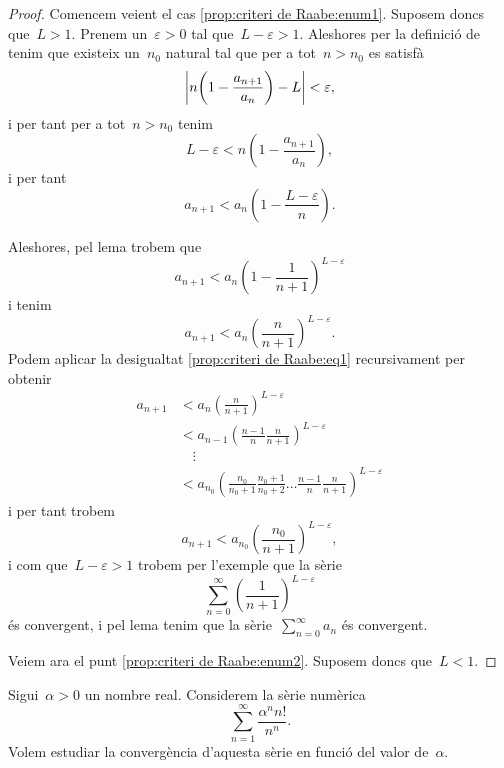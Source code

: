 \documentclass[../../main.tex]{subfiles}
\begin{document}
    \begin{proof}
        Comencem veient el cas \eqref{prop:criteri de Raabe:enum1}.
        Suposem doncs que~\(L>1\).
        Prenem un~\(\varepsilon>0\) tal que~\(L-\varepsilon>1\).
        Aleshores per la definició de  tenim que existeix un~\(n_{0}\) natural tal que per a tot~\(n>n_{0}\) es satisfà
        \[
            \abs{n\left(1-\frac{a_{n+1}}{a_{n}}\right)-L}<\varepsilon,
        \]
        i per tant per a tot~\(n>n_{0}\) tenim
        \[
            L-\varepsilon<n\left(1-\frac{a_{n+1}}{a_{n}}\right),
        \]
        i per tant
        \[
            a_{n+1}<a_{n}\left(1-\frac{L-\varepsilon}{n}\right).
        \]

        Aleshores, pel lema  trobem que
        \[
            a_{n+1}<a_{n}\left(1-\frac{1}{n+1}\right)^{L-\varepsilon}
        \]
        i tenim
        \begin{equation}
            \label{prop:criteri de Raabe:eq1}
            a_{n+1}<a_{n}\left(\frac{n}{n+1}\right)^{L-\varepsilon}.
        \end{equation}
        Podem aplicar la desigualtat \eqref{prop:criteri de Raabe:eq1} recursivament per obtenir
        \begin{align*}
            a_{n+1}&<a_{n}\left(\frac{n}{n+1}\right)^{L-\varepsilon}\\
            &<a_{n-1}\left(\frac{n-1}{n}\frac{n}{n+1}\right)^{L-\varepsilon}\\
            &\quad\vdots\\
            &<a_{n_{0}}\left(\frac{n_{0}}{n_{0}+1}\frac{n_{0}+1}{n_{0}+2}\dots\frac{n-1}{n}\frac{n}{n+1}\right)^{L-\varepsilon}
        \end{align*}
        i per tant trobem
        \[
            a_{n+1}<a_{n_{0}}\left(\frac{n_{0}}{n+1}\right)^{L-\varepsilon},
        \]
        i com que~\(L-\varepsilon>1\) trobem per l'exemple  que la sèrie
        \[
            \sum_{n=0}^{\infty}\left(\frac{1}{n+1}\right)^{L-\varepsilon}
        \]
        és convergent, i pel lema  tenim que la sèrie~\(\sum_{n=0}^{\infty}a_{n}\) és convergent.

        Veiem ara el punt \eqref{prop:criteri de Raabe:enum2}.
        Suposem doncs que~\(L<1\).
    \end{proof}
    \begin{example}
        \label{ex:quocient + Raabe}
        Sigui~\(\alpha>0\) un nombre real.
        Considerem la sèrie numèrica
        \begin{equation}
            \label{ex:quocient + Raabe:eq1}
            \sum_{n=1}^{\infty}\frac{\alpha^{n}n!}{n^{n}}.
        \end{equation}
        Volem estudiar la convergència d'aquesta sèrie en funció del valor de~\(\alpha\).
    \end{example}
\end{document}
